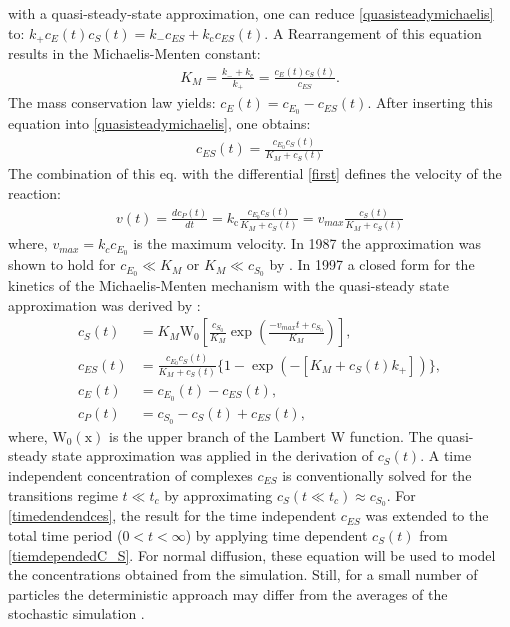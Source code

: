 \documentclass[
  a4paper,BCOR10mm,twoside,
  headsepline,footsepline,%
  fleqn,openbib
]{scrbook}
\begin{document}
with a quasi-steady-state approximation, one can reduce \cref{quasisteadymichaelis} to: $ k_{\mathrm{+}}c_E(t) c_S(t)=k_{\mathrm{-}}c_{ES}+k_{\mathrm{c}}c_{ES}(t)$. A Rearrangement of this equation results in the Michaelis-Menten constant:
\begin{align}
 K_M=\frac{k_{\mathrm{-}}+k_{\mathrm{c}}}{k_{\mathrm{+}}}=\frac{c_E(t) c_S(t)}{c_{ES}}. 
\end{align}
The mass conservation law yields: $c_E(t)=c_{E_0} -c_{ES}(t)$. After inserting this equation into \cref{quasisteadymichaelis}, one obtains:
\begin{align}
 c_{ES}(t)=\frac{c_{E_0} c_S(t)}{K_M+c_S(t)}
\end{align}
The combination of this eq. with the differential \cref{first} defines the velocity of the reaction:
\begin{align}
 v(t)= \frac{dc_P(t)}{dt}= k_{\mathrm{c}} \frac{c_{E_0} c_S(t)}{K_M+c_S(t)} = v_{max} \frac{c_S(t)}{K_M+c_S(t)}  
\end{align}
where, $v_{max}=k_c c_{E_0}$ is the maximum velocity. In 1987 the approximation was shown to hold for $c_{E_0}\ll K_M \text{ or } K_M \ll c_{S_0}$ by \citet{Palsson1987}. In 1997 a closed form for the kinetics of the Michaelis-Menten mechanism with the quasi-steady state approximation was derived by  \citet{Schnell1997}:
\begin{align}
 c_S(t)&=K_M \mathrm{W_0}\left[\frac{c_{S_0}}{K_M} \exp \left( \frac{-v_{max} t + c_{S_0}}{K_M}\right)\right],  \label{tiemdependedC_S} \\
 c_{ES}(t)&= \frac{c_{E_0} c_S(t)}{K_M+c_S(t)} \lbrace 1- \exp \left( - \left[ K_M + c_S(t) k_{+} \right] \right) \rbrace, \label{timedendendces}\\ 
 c_{E}(t)&=c_{E_0}(t)-c_{ES}(t), \label{timedendendce}\\
 c_{P}(t)&=c_{S_0}-c_S(t)+c_{ES}(t), \label{timedendendcp}
\end{align}
where,  $\mathrm{W_0(x)}$ is the upper branch of the Lambert W function. The quasi-steady state approximation was applied in the derivation of $c_S(t)$. A time independent   concentration of complexes $c_{ES}$ is conventionally solved for the transitions regime $t \ll t_c$ by approximating $c_S(t \ll t_c) \approx c_{S_0}$. For \cref{timedendendces}, the result for the time independent $c_{ES}$ was extended to the total time period ($0<t<\infty$) by applying time dependent $c_S(t)$ from \cref{tiemdependedC_S}. For normal diffusion, these equation will be used to model the concentrations obtained from the simulation.  Still, for a small number of particles the deterministic approach may differ from the averages of the stochastic simulation \cite{Turner2004}.\par
\end{document}

